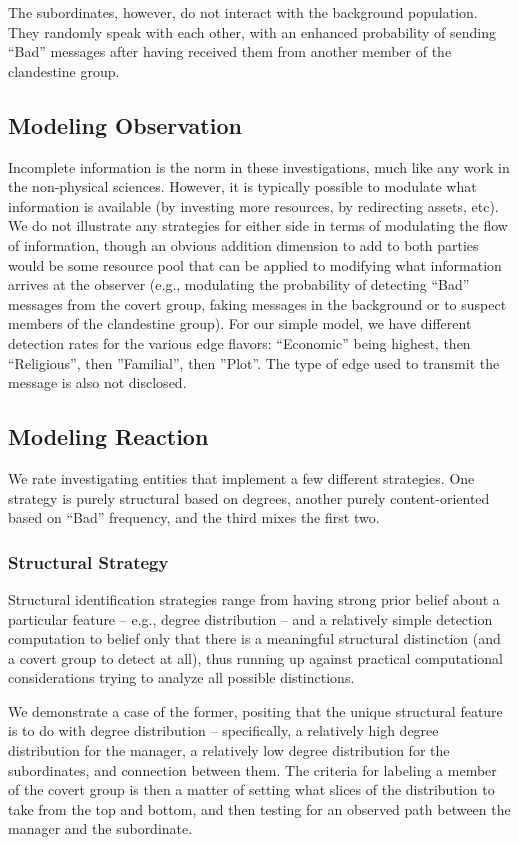 \documentclass{article}
\begin{document}
The subordinates, however, do not interact with the background population.  They randomly speak with each other, with an enhanced probability of sending ``Bad'' messages after having received them from another member of the clandestine group.

\subsection*{Modeling Observation}
Incomplete information is the norm in these investigations, much like any work in the non-physical sciences.  However, it is typically possible to modulate what information is available (by investing more resources, by redirecting assets, etc).  We do not illustrate any strategies for either side in terms of modulating the flow of information, though an obvious addition dimension to add to both parties would be some resource pool that can be applied to modifying what information arrives at the observer (e.g., modulating the probability of detecting ``Bad'' messages from the covert group, faking messages in the background or to suspect members of the clandestine group).  For our simple model, we have different detection rates for the various edge flavors: ``Economic'' being highest, then ``Religious'', then ''Familial'', then ''Plot''.  The type of edge used to transmit the message is also not disclosed.

\subsection*{Modeling Reaction}
We rate investigating entities that implement a few different strategies.  One strategy is purely structural based on degrees, another purely content-oriented based on ``Bad'' frequency, and the third mixes the first two.

\subsubsection*{Structural Strategy}
Structural identification strategies range from having strong prior belief about a particular feature -- e.g., degree distribution -- and a relatively simple detection computation to belief only that there is a meaningful structural distinction (and a covert group to detect at all), thus running up against practical computational considerations trying to analyze all possible distinctions.

We demonstrate a case of the former, positing that the unique structural feature is to do with degree distribution -- specifically, a relatively high degree distribution for the manager, a relatively low degree distribution for the subordinates, and connection between them.  The criteria for labeling a member of the covert group is then a matter of setting what slices of the distribution to take from the top and bottom, and then testing for an observed path between the manager and the subordinate.
\end{document}
